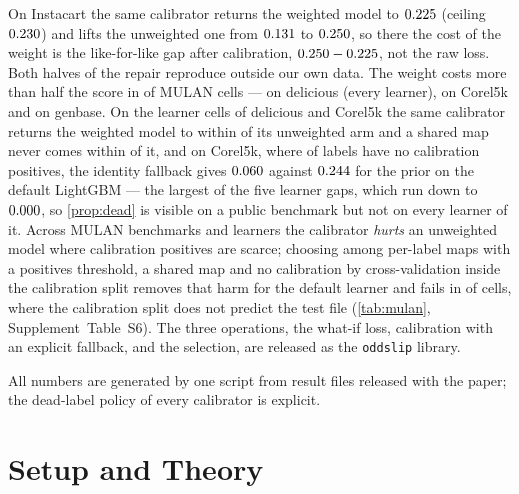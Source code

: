 \documentclass[sigconf,nonacm]{acmart}
\newcommand{\Supp}[1]{Supplement~#1}  %
\begin{document}
\begin{enumerate}[leftmargin=*,nosep]
On Instacart the same calibrator returns the weighted model to $0.225$ (ceiling $0.230$) and lifts the unweighted one from $0.131$ to $0.250$, so there the cost of the weight is the like-for-like gap after calibration, $0.250-0.225$, not the raw loss. Both halves of the repair reproduce outside our own data. The weight costs more than half the score in \nnCollapseCells{} of \nnDoseCells{} MULAN cells --- \nnDelCollapseLearners{} on delicious (every learner), \nnCorelCollapseLearners{} on Corel5k and \nnOtherCollapseCells{} on genbase. On the \nnRepairCollapseCells{} learner cells of delicious and Corel5k the same calibrator returns the weighted model to within \nmaxRepairGapCollapse{} of its unweighted arm and a shared map never comes within \nminPooledGapCollapse{} of it, and on Corel5k, where \ncorelDeadCalDose{} of \ncorelL{} labels have no calibration positives, the identity fallback gives $0.060$ against $0.244$ for the prior on the default LightGBM --- the largest of the five learner gaps, which run down to $0.000$, so \cref{prop:dead} is visible on a public benchmark but not on every learner of it. Across \nnMulan{} MULAN benchmarks and \nnLearners{} learners the calibrator \emph{hurts} an unweighted model where calibration positives are scarce; choosing among per-label maps with a positives threshold, a shared map and no calibration by cross-validation inside the calibration split removes that harm for the default learner and fails in \nnTauSelBelowRaw{} of \nnTauCells{} cells, where the calibration split does not predict the test file (\cref{tab:mulan}, \Supp{Table~S6}). The three operations, the what-if loss, calibration with an explicit fallback, and the selection, are released as the \texttt{oddslip} library.
\end{enumerate}
All numbers are generated by one script from result files released with the paper; the dead-label policy of every calibrator is explicit.

\section{Setup and Theory}
\label{sec:theory}
\end{document}
